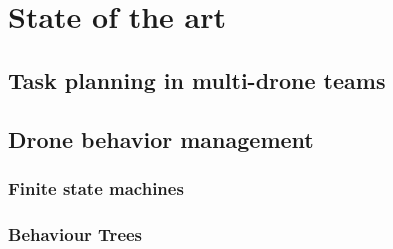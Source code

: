 \chapter{State of the art}
\label{ch:StateOfTheArt}


\section{Task planning in multi-drone teams}
\label{sec:TaskPlanning}

\section{Drone behavior management}
\label{sec:DroneBehaviorManagement}

\subsection{Finite state machines}
\label{sec:FiniteStateMachines}

\subsection{Behaviour Trees}
\label{sec:FiniteStateMachines}

\endinput

